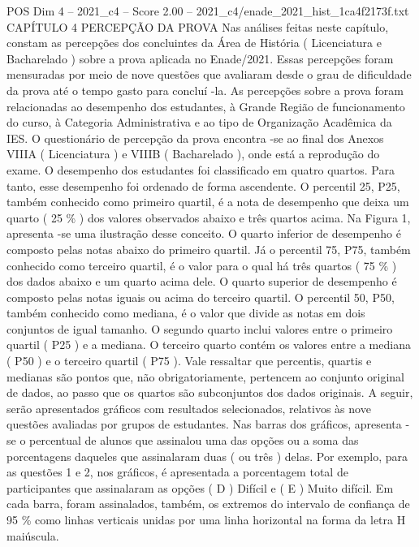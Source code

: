\begin{textsample}{POS Dim 4 – 2021\_c4 – Score 2.00 – 2021\_c4/enade\_2021\_hist\_1ca4f2173f.txt}  \label{ex:f4_pos_135}
CAPÍTULO 4 PERCEPÇÃO DA PROVA Nas análises feitas neste capítulo, constam as percepções dos concluintes da Área de História ( Licenciatura e Bacharelado ) sobre a prova aplicada no Enade/2021.
Essas percepções foram mensuradas por meio de nove questões que avaliaram desde o grau de dificuldade da prova até o tempo gasto para concluí -la.
As percepções sobre a prova foram relacionadas ao desempenho dos estudantes, à Grande Região de funcionamento do curso, à Categoria Administrativa e ao tipo de Organização Acadêmica da IES.
O questionário de percepção da prova encontra -se ao final dos Anexos VIIIA ( Licenciatura ) e VIIIB ( Bacharelado ), onde está a reprodução do exame.
O desempenho dos estudantes foi classificado em quatro quartos.
Para tanto, esse desempenho foi ordenado de forma ascendente.
O percentil 25, P25, também conhecido como primeiro quartil, é a nota de desempenho que deixa um quarto ( 25 \% ) dos valores observados abaixo e três quartos acima.
Na Figura 1, apresenta -se uma ilustração desse conceito.
O quarto inferior de desempenho é composto pelas notas abaixo do primeiro quartil.
Já o percentil 75, P75, também conhecido como terceiro quartil, é o valor para o qual há três quartos ( 75 \% ) dos dados abaixo e um quarto acima dele.
O quarto superior de desempenho é composto pelas notas iguais ou acima do terceiro quartil.
O percentil 50, P50, também conhecido como mediana, é o valor que divide as notas em dois conjuntos de igual tamanho.
O segundo quarto inclui valores entre o primeiro quartil ( P25 ) e a mediana.
O terceiro quarto contém os valores entre a mediana ( P50 ) e o terceiro quartil ( P75 ).
Vale ressaltar que percentis, quartis e medianas são pontos que, não obrigatoriamente, pertencem ao conjunto original de dados, ao passo que os quartos são subconjuntos dos dados originais.
A seguir, serão apresentados gráficos com resultados selecionados, relativos às nove questões avaliadas por grupos de estudantes.
Nas barras dos gráficos, apresenta -se o percentual de alunos que assinalou uma das opções ou a soma das porcentagens daqueles que assinalaram duas ( ou três ) delas.
Por exemplo, para as questões 1 e 2, nos gráficos, é apresentada a porcentagem total de participantes que assinalaram as opções ( D ) Difícil e ( E ) Muito difícil.
Em cada barra, foram assinalados, também, os extremos do intervalo de confiança de 95 \% como linhas verticais unidas por uma linha horizontal na forma da letra H maiúscula.

\end{textsample}
